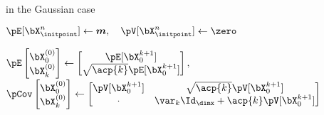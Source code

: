 \begin{algorithm}[h]
    \caption{ in the Gaussian case}
    \begin{algorithmic}[1]
        \STATE $\pE[\bX_{\initpoint}^n] \gets \mean,
            \quad
            \pV[\bX_{\initpoint}^n] \gets \zero$

            
            \STATE $\pE\begin{bmatrix}\bX_0^{(0)}\\\bX_k^{(0)}\end{bmatrix} \gets \begin{bmatrix}\pE[\bX_0^{k+1}]\\\sqrt{\acp{k}}\pE[\bX_0^{k+1}]\end{bmatrix},$ \qquad
            $\pCov\begin{bmatrix}\bX_0^{(0)}\\\bX_k^{(0)}\end{bmatrix} \gets \begin{bmatrix}\pV[\bX_0^{k+1}] & \sqrt{\acp{k}}\pV[\bX_0^{k+1}]\\\cdot & \var_{k} \Id_\dimx + \acp{k} \pV[\bX_0^{k+1}]\end{bmatrix}$

                

\end{algorithmic}
\end{algorithm}
